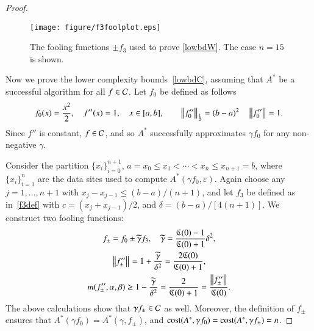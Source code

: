 \documentclass[review]{elsarticle}
\newcommand{\abstol}{\varepsilon}
\theoremstyle{definition}
\newcommand{\tgamma}{\widetilde{\gamma}}
\begin{document}
\begin{proof}
\begin{figure}
	\centering
	\texttt{[image: figure/f3foolplot.eps]}
	\caption{The fooling functions $\pm f_3$ used to prove \eqref{lowbdW}.  The case $n=15$ is shown.  \label{f3foolplot}}
\end{figure}
	
Now we prove the lower complexity bounds~\eqref{lowbdC}, assuming that $A^*$ be a successful algorithm for all $f  \in \mathcal{C}$.  Let $f_0$ be defined as follows
\begin{equation}
\label{assumpfzero}
f_0(x) =\frac{x^2}{2}, \quad f''(x) = 1, \quad x \in [a,b], \qquad \norm[\frac12]{f_0''} = (b -a)^2  \quad \norm{f_0''} = 1.
\end{equation}
Since $f''$ is constant, $f \in \mathcal{C}$, and so $A^*$ successfully approximates $\gamma f_0$ for any non-negative $\gamma$.

Consider the partition $\{x_i\}_{i=0}^{n+1}$, $a=x_0 \le x_1 < \cdots < x_n \le x_{n+1} = b$, where $\{x_i\}_{i=1}^n$ are the data sites used to compute  $A^*(\gamma f_0,\abstol)$.    Again choose any $j=1, \ldots, n+1$ with $x_j-x_{j-1} \le (b-a)/(n+1)$, and let $f_3$ be defined as in~\eqref{f3def} with $c = (x_j+x_{j-1})/2$, and $\delta  = (b-a)/[4(n+1)]$. We construct two fooling functions:
\begin{gather*}
f_{\pm} = f_0 \pm \tgamma f_3, \quad \tgamma =\frac{\fC(0)-1}{\fC(0)+1}\delta^2, \\
\norm{f''_{\pm}} = 1+\frac{\tgamma}{\delta^2} = \frac{2\fC(0)}{\fC(0)+1} , \\
m(f''_{\pm},\alpha,\beta) \ge 1-\frac{\tgamma}{\delta^2} = \frac{2}{\fC(0)+1} = \frac{\norm{f''_{\pm}} }{\fC(0)}.
\end{gather*}
The above calculations show that $\gamma f_{\pm} \in \mathcal{C}$ as well.  Moreover, the definition of $f_{\pm}$ ensures that
$A^*(\gamma f_0) = A^*(\gamma,f_{\pm})$, and $\operatorname{cost}(A^*,\gamma f_0) = \operatorname{cost}(A^*,\gamma f_{\pm}) = n$.


\end{proof}
\end{document}
